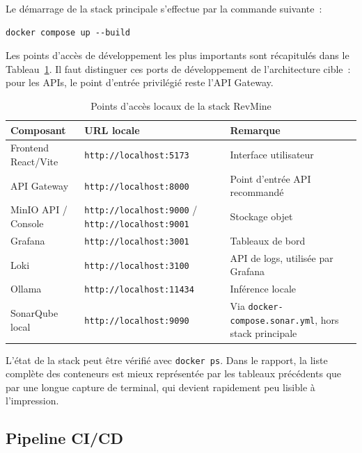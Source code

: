 Le démarrage de la stack principale s'effectue par la commande suivante~:
\begin{verbatim}
docker compose up --build
\end{verbatim}

Les points d'accès de développement les plus importants sont récapitulés dans le
Tableau~\ref{tab:docker-access}. Il faut distinguer ces ports de développement de l'architecture
cible~: pour les APIs, le point d'entrée privilégié reste l'API Gateway.

\begin{table}[H]
\centering
\small
\caption{Points d'accès locaux de la stack RevMine}
\label{tab:docker-access}
\begin{tabular}{|>{\raggedright\arraybackslash}p{4.2cm}
                |>{\raggedright\arraybackslash}p{5.1cm}
                |>{\raggedright\arraybackslash}p{4cm}|}
\hline
\textbf{Composant} & \textbf{URL locale} & \textbf{Remarque} \\
\hline
Frontend React/Vite & \texttt{http://localhost:5173} & Interface utilisateur \\
\hline
API Gateway & \texttt{http://localhost:8000} & Point d'entrée API recommandé \\
\hline
MinIO API / Console & \texttt{http://localhost:9000} / \texttt{http://localhost:9001} & Stockage objet \\
\hline
Grafana & \texttt{http://localhost:3001} & Tableaux de bord \\
\hline
Loki & \texttt{http://localhost:3100} & API de logs, utilisée par Grafana \\
\hline
Ollama & \texttt{http://localhost:11434} & Inférence locale \\
\hline
SonarQube local & \texttt{http://localhost:9090} & Via \texttt{docker-compose.sonar.yml}, hors stack principale \\
\hline
\end{tabular}
\end{table}

L'état de la stack peut être vérifié avec \texttt{docker ps}. Dans le rapport, la liste complète
des conteneurs est mieux représentée par les tableaux précédents que par une longue capture de
terminal, qui devient rapidement peu lisible à l'impression.

\subsection{Pipeline CI/CD}
\label{subsec:cicd}

